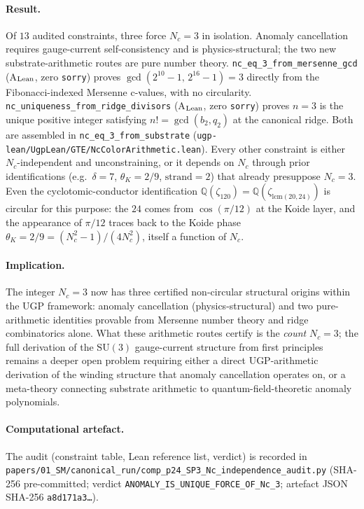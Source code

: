 \documentclass[11pt]{article}
\theoremstyle{remark}
\newcommand{\Nc}{N_c}
\newcommand{\zetaN}[1]{\zeta_{#1}}
\begin{document}
\paragraph{Result.}
Of $13$ audited constraints, three force $\Nc = 3$ in isolation.
Anomaly cancellation requires gauge-current self-consistency and is
physics-structural; the two new substrate-arithmetic routes are pure number theory.
\texttt{nc\_eq\_3\_from\_mersenne\_gcd} (A$_{\rm Lean}$, zero \texttt{sorry}) proves
$\gcd(2^{10}-1,\,2^{16}-1) = 3$ directly from the Fibonacci-indexed
Mersenne c-values, with no circularity.
\texttt{nc\_uniqueness\_from\_ridge\_divisors} (A$_{\rm Lean}$, zero \texttt{sorry})
proves $n = 3$ is the unique positive integer satisfying $n! = \gcd(b_2, q_2)$
at the canonical ridge.
Both are assembled in \texttt{nc\_eq\_3\_from\_substrate}
(\texttt{ugp-lean/UgpLean/GTE/NcColorArithmetic.lean}).
Every other constraint is either $\Nc$-independent and unconstraining,
or it depends on $\Nc$ through prior identifications (e.g.\ $\delta = 7$,
$\theta_K = 2/9$, $\mathrm{strand} = 2$) that already presuppose $\Nc = 3$.
Even the cyclotomic-conductor identification
$\mathbb{Q}(\zetaN{120}) = \mathbb{Q}(\zetaN{\mathrm{lcm}(20,24)})$ is circular for
this purpose: the $24$ comes from $\cos(\pi/12)$ at the Koide layer, and the
appearance of $\pi/12$ traces back to the Koide phase
$\theta_K = 2/9 = (\Nc^2-1)/(4\Nc^2)$, itself a function of $\Nc$.

\paragraph{Implication.}
The integer $\Nc = 3$ now has three certified non-circular structural origins
within the UGP framework: anomaly cancellation (physics-structural) and two
pure-arithmetic identities provable from Mersenne number theory and ridge
combinatorics alone.
What these arithmetic routes certify is the \emph{count} $\Nc = 3$; the full
derivation of the $\mathrm{SU}(3)$ gauge-current structure from first principles
remains a deeper open problem requiring either a direct UGP-arithmetic derivation
of the winding structure that anomaly cancellation operates on, or a meta-theory
connecting substrate arithmetic to quantum-field-theoretic anomaly polynomials.

\paragraph{Computational artefact.}
The audit (constraint table, Lean reference list, verdict) is recorded in
\nolinkurl{papers/01_SM/canonical_run/comp_p24_SP3_Nc_independence_audit.py}
(SHA-256 pre-committed; verdict
\texttt{ANOMALY\_IS\_UNIQUE\_\allowbreak FORCE\_OF\_Nc\_3};
artefact JSON SHA-256 \texttt{a8d171a3\ldots}).
\end{document}
